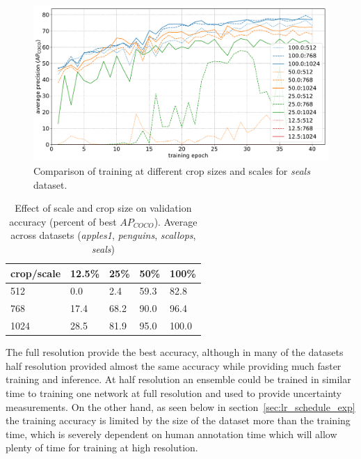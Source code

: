  
\begin{figure}[h]
  \centering
  \includegraphics[width=1.0\linewidth]{charts/training/crops_scales/seals.pdf}
  \caption{Comparison of training at different crop sizes and scales for \emph{seals} dataset. }  
  \label{fig:seals_crop_scale}
\end{figure}


\begin{table}[ht]
  \centering
    \caption{Effect of scale and crop size on validation accuracy (percent of best $AP_{COCO}$). Average across datasets (\emph{apples1}, \emph{penguins}, \emph{scallops}, \emph{seals}) }

  \begin{tabular}{ l | l l l l}
    crop/scale & 12.5\% & 25\% & 50\% & 100\% \\
    \toprule
        512   & 0.0  & 2.4  &  59.3  & 82.8 \\
        768   & 17.4 & 68.2  &  90.0 &  96.4 \\
        1024  & 28.5 & 81.9  &  95.0  & 100.0 \\
    \bottomrule
  \end{tabular}
\label{fig:accuracy_scale_crop}
\end{table}


The full resolution provide the best accuracy, although in many of the datasets half resolution provided almost the same accuracy while providing much faster training and inference. At half resolution an ensemble could be trained in similar time to training one network at full resolution and used to provide uncertainty measurements. On the other hand, as seen below in section~\ref{sec:lr_schedule_exp} the training accuracy is limited by the size of the dataset more than the training time, which is severely dependent on human annotation time which will allow plenty of time for training at high resolution.

